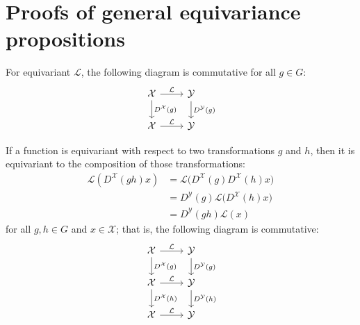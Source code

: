 \documentclass{article}
\begin{document}



\clearpage

\renewcommand\thesection{\Alph{section}}
\setcounter{section}{0}
\renewcommand{\thefigure}{S\arabic{figure}}
\renewcommand{\thetable}{S\arabic{table}}
\setcounter{figure}{0}
\setcounter{table}{0}

\section{Proofs of general equivariance propositions}
\label{sec:proof_equivariance}

For equivariant $\mathcal{L}$, the following diagram is commutative for all $g\in G$:
\[\begin{tikzcd}
\mathcal{X} \arrow[r, "\mathcal{L}"] \arrow[d, "D^\mathcal{X}(g)"] & \mathcal{Y} \arrow[d, "D^\mathcal{Y}(g)"] \\
\mathcal{X} \arrow[r, "\mathcal{L}"]& \mathcal{Y}
\end{tikzcd}\]

If a function is equivariant with respect to two transformations $g$ and $h$, then it is equivariant to the composition of those transformations: 
\[
\begin{split}\mathcal{L}(D^\mathcal{X}(gh)x) &= \mathcal{L}\big(D^\mathcal{X}(g) D^\mathcal{X}(h) x\big) \\
&= D^\mathcal{Y}(g)\mathcal{L}\big(D^\mathcal{X}(h) x\big) \\
&= D^\mathcal{Y}(gh) \mathcal{L}(x)
\end{split}
\] 
for all $g, h \in G$ and $x\in \mathcal{X}$; that is, the following diagram is commutative:
\[\begin{tikzcd}
\mathcal{X} \arrow[r, "\mathcal{L}"] \arrow[d, "D^\mathcal{X}(g)"] & \mathcal{Y} \arrow[d, "D^\mathcal{Y}(g)"] \\
\mathcal{X} \arrow[r, "\mathcal{L}"] \arrow[d, "D^\mathcal{X}(h)"] & \mathcal{Y} \arrow[d, "D^\mathcal{Y}(h)"] \\
\mathcal{X} \arrow[r, "\mathcal{L}"] & \mathcal{Y}
\end{tikzcd}\]
\end{document}
